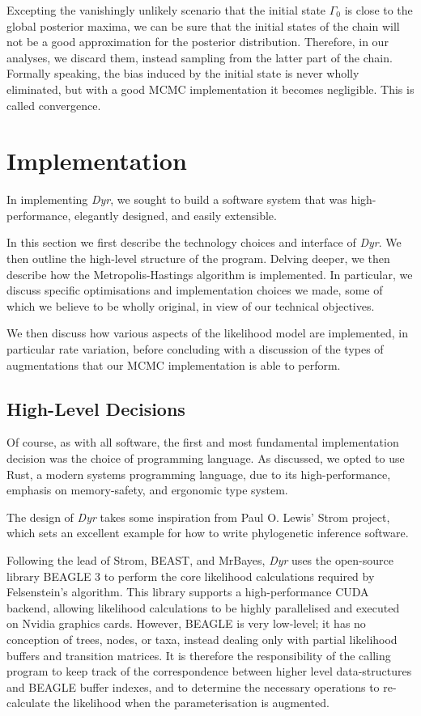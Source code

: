 \documentclass[10pt,journal,compsoc]{IEEEtran}
\begin{document}
Excepting the vanishingly unlikely scenario that the initial state $\Gamma_0$ is close to the global posterior maxima, we can be sure that the initial states of the chain will not be a good approximation for the posterior distribution. Therefore, in our analyses, we discard them, instead sampling from the latter part of the chain. Formally speaking, the bias induced by the initial state is never wholly eliminated, but with a good MCMC implementation it becomes negligible. This is called convergence\cite{chib1995understanding}.

\section{Implementation}\label{sec:implementation}

In implementing \textit{Dyr}, we sought to build a software system that was high-performance, elegantly designed, and easily extensible.

In this section we first describe the technology choices and interface of \textit{Dyr}. We then outline the high-level structure of the program. Delving deeper, we then describe how the Metropolis-Hastings algorithm is implemented. In particular, we discuss specific optimisations and implementation choices we made, some of which we believe to be wholly original, in view of our technical objectives.

We then discuss how various aspects of the likelihood model are implemented, in particular rate variation, before concluding with a discussion of the types of augmentations that our MCMC implementation is able to perform.

\subsection{High-Level Decisions}

Of course, as with all software, the first and most fundamental implementation decision was the choice of programming language. As discussed, we opted to use Rust, a modern systems programming language, due to its high-performance, emphasis on memory-safety, and ergonomic type system.

The design of \textit{Dyr} takes some inspiration from Paul O. Lewis' Strom project, which sets an excellent example for how to write phylogenetic inference software\cite{ayres2019beagle}.

Following the lead of Strom, BEAST, and MrBayes, \textit{Dyr} uses the open-source library BEAGLE 3 to perform the core likelihood calculations required by Felsenstein's algorithm. This library supports a high-performance CUDA backend, allowing likelihood calculations to be highly parallelised and executed on Nvidia graphics cards. However, BEAGLE is very low-level; it has no conception of trees, nodes, or taxa, instead dealing only with partial likelihood buffers and transition matrices. It is therefore the responsibility of the calling program to keep track of the correspondence between higher level data-structures and BEAGLE buffer indexes, and to determine the necessary operations to re-calculate the likelihood when the parameterisation is augmented.
\end{document}
